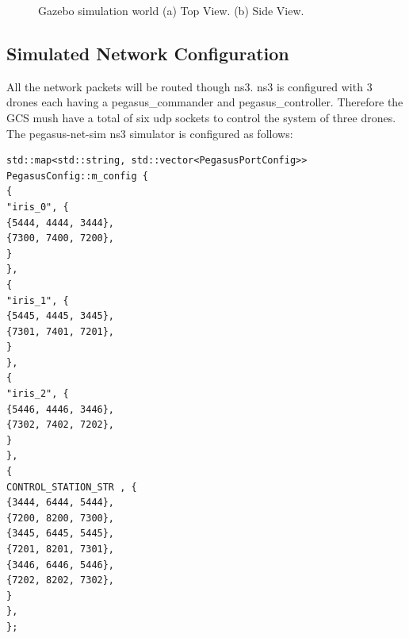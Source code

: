 \begin{figure}
	\centering
	\caption[Gazebo simulation world.]{\small Gazebo simulation world 
		(a) Top View. (b) Side View. }
	
	\label{fig:sim-world}
\end{figure}

\subsection{Simulated Network Configuration}

All the network packets will be routed though ns3. ns3 is configured with 3 drones each having a pegasus\_commander and pegasus\_controller. Therefore the GCS mush have a total of six udp sockets to control the system of three drones. The pegasus-net-sim ns3 simulator is configured as follows:

\begin{verbatim}
std::map<std::string, std::vector<PegasusPortConfig>> 
PegasusConfig::m_config {
{
"iris_0", {
{5444, 4444, 3444},
{7300, 7400, 7200},
}
},
{
"iris_1", {
{5445, 4445, 3445},
{7301, 7401, 7201},
}
},
{
"iris_2", {
{5446, 4446, 3446},
{7302, 7402, 7202},
}
},
{
CONTROL_STATION_STR , {
{3444, 6444, 5444},
{7200, 8200, 7300},
{3445, 6445, 5445},
{7201, 8201, 7301},
{3446, 6446, 5446},
{7202, 8202, 7302},
}
},
};
\end{verbatim}

